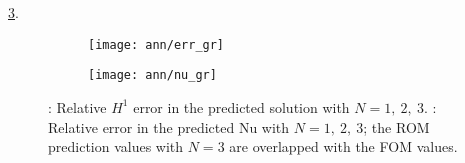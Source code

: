 \ref{fig:5}.  \begin{figure}[h]
     \centering
     \begin{subfigure}[b]{0.45\textwidth}
         \centering
         \texttt{[image: ann/err\_gr]}
         \caption{}
         \label{fig:3_a}
     \end{subfigure}
     \hfill
     \begin{subfigure}[b]{0.45\textwidth}
         \centering
         \texttt{[image: ann/nu\_gr]}
         \caption{}
         \label{fig:3_b}
     \end{subfigure}
     \caption{: Relative $H^1$ error in the predicted solution
     with $N=1,~2,~3$.  : Relative error in the predicted Nu
     with $N=1,~2,~3$; the ROM prediction values with $N=3$ are overlapped with
     the FOM values.} \label{fig:5}
\end{figure}
